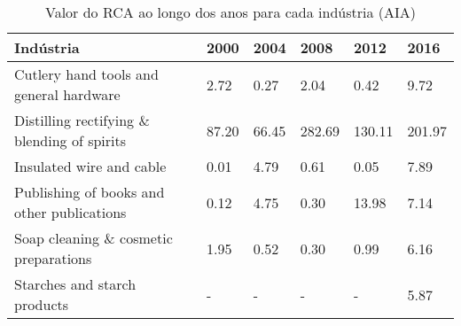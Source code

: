 \begin{table}
\centering
\caption{Valor do RCA ao longo dos anos para cada indústria (AIA)}
\begin{tabular}{p{6cm}p{1.5cm}p{1.5cm}p{1.5cm}p{1.5cm}p{1.5cm}}
\toprule
                                  Indústria &  2000 &  2004 &   2008 &   2012 &   2016 \\
\midrule
    Cutlery hand tools and general hardware &  2.72 &  0.27 &   2.04 &   0.42 &   9.72 \\
Distilling rectifying \& blending of spirits & 87.20 & 66.45 & 282.69 & 130.11 & 201.97 \\
                   Insulated wire and cable &  0.01 &  4.79 &   0.61 &   0.05 &   7.89 \\
 Publishing of books and other publications &  0.12 &  4.75 &   0.30 &  13.98 &   7.14 \\
      Soap cleaning \& cosmetic preparations &  1.95 &  0.52 &   0.30 &   0.99 &   6.16 \\
               Starches and starch products &     - &     - &      - &      - &   5.87 \\
\bottomrule
\end{tabular}
\end{table}
